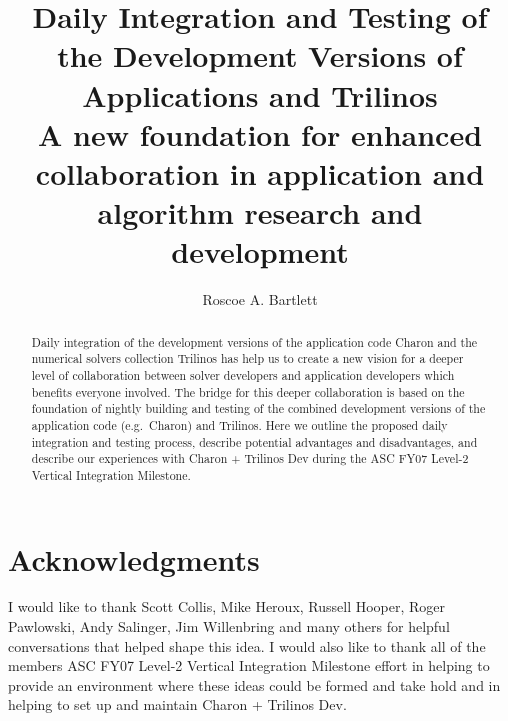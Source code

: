 \documentclass[pdf,ps2pdf,11pt]{SANDreport}
\title{\center
Daily Integration and Testing of the Development Versions of Applications and
Trilinos\\[2ex] {\Large A new foundation for enhanced collaboration in
application and algorithm research and development}}
\author{Roscoe A. Bartlett}
\begin{document}
\maketitle

%


%
\begin{abstract}
%

Daily integration of the development versions of the application code Charon
and the numerical solvers collection Trilinos has help us to create a new
vision for a deeper level of collaboration between solver developers and
application developers which benefits everyone involved.  The bridge for this
deeper collaboration is based on the foundation of nightly building and
testing of the combined development versions of the application code (e.g.\
Charon) and Trilinos.  Here we outline the proposed daily integration and
testing process, describe potential advantages and disadvantages, and describe
our experiences with Charon + Trilinos Dev during the ASC FY07 Level-2
Vertical Integration Milestone.

%
\end{abstract}
%

%
\clearpage
\section*{Acknowledgments}

I would like to thank Scott Collis, Mike Heroux, Russell Hooper, Roger
Pawlowski, Andy Salinger, Jim Willenbring and many others for helpful
conversations that helped shape this idea.  I would also like to thank all of
the members ASC FY07 Level-2 Vertical Integration Milestone effort in helping
to provide an environment where these ideas could be formed and take hold and
in helping to set up and maintain Charon + Trilinos Dev.

%
\end{document}
